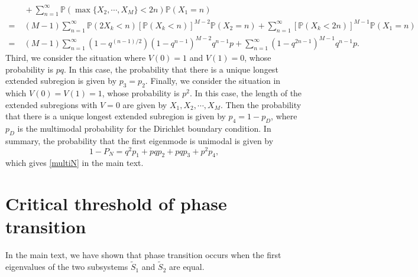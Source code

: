 \documentclass[a4paper,11pt]{article}
\begin{document}
\begin{appendices}
\begin{equation*}
\begin{split}
&\; + \sum_{n=1}^{\infty} \mathbb{P}(\max\{X_2, \cdots, X_M\} < 2 n) \mathbb{P}(X_1 = n) \\
= &\; (M-1) \sum_{n=1}^{\infty} \mathbb{P}(2 X_k < n) [\mathbb{P}(X_k < n)]^{M-2} \mathbb{P}(X_2 = n) + \sum_{n=1}^{\infty} [\mathbb{P}(X_k < 2 n)]^{M-1} \mathbb{P}(X_1 = n) \\
= &\; (M-1) \sum_{n=1}^{\infty} (1 - q^{(n-1)/2}) (1 - q^{n-1})^{M-2} q^{n-1} p + \sum_{n=1}^{\infty} (1 - q^{2n-1})^{M-1} q^{n-1} p.
\end{split}
\end{equation*}
Third, we consider the situation where $V(0) = 1$ and $V(1) = 0$, whose probability is $pq$. In this case, the probability that there is a unique longest extended subregion is given by $p_3 = p_2$. Finally, we consider the situation in which $V(0) = V(1) = 1$, whose probability is $p^2$. In this case, the length of the extended subregions with $V = 0$ are given by $X_1, X_2, \cdots, X_M$. Then the probability that there is a unique longest extended subregion is given by $p_4 = 1-p_D$, where $p_D$ is the multimodal probability for the Dirichlet boundary condition. In summary, the probability that the first eigenmode is unimodal is given by
\begin{equation*}
1-P_N = q^2p_1+pqp_2+pqp_3+p^2p_4,
\end{equation*}
which gives \eqref{multiN} in the main text.


\section{Critical threshold of phase transition}\label{appC}
In the main text, we have shown that phase transition occurs when the first eigenvalues of the two subsystems $\tilde{S}_1$ and $\tilde{S}_2$ are equal.


\end{appendices}
\end{document}
